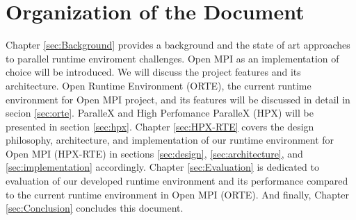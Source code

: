 \section{Organization of the Document}
Chapter \ref{sec:Background} provides a background and the state of art approaches to parallel runtime enviroment challenges. Open MPI as an implementation of choice will be introduced. We will discuss the project features and its architecture. Open Runtime Environment (ORTE), the current runtime environment for Open MPI project, and its features will be discussed in detail in secion \ref{sec:orte}. ParalleX and High Perfomance ParalleX (HPX) will be presented in section \ref{sec:hpx}. Chapter \ref{sec:HPX-RTE} covers the design philosophy, architecture, and implementation of our runtime environment for Open MPI (HPX-RTE) in sections \ref{sec:design}, \ref{sec:architecture}, and \ref{sec:implementation} accordingly. Chapter \ref{sec:Evaluation} is dedicated to evaluation of our developed runtime environment and its performance compared to the current runtime environment in Open MPI (ORTE). And finally, Chapter \ref{sec:Conclusion} concludes this document.
